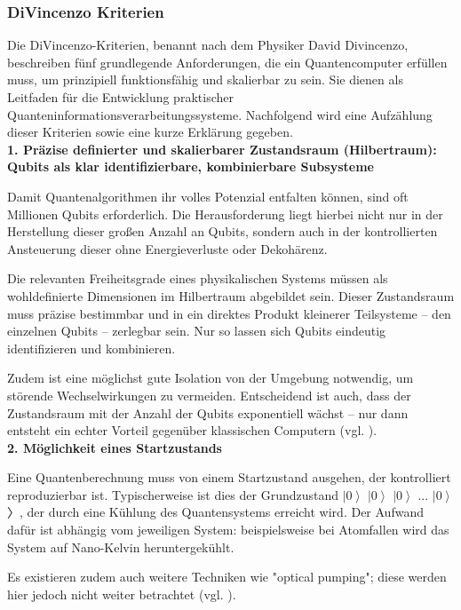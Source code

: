 \subsubsection{DiVincenzo Kriterien}

Die DiVincenzo-Kriterien, benannt nach dem Physiker David Divincenzo, beschreiben fünf grundlegende Anforderungen, die ein Quantencomputer erfüllen muss, um prinzipiell funktionsfähig und skalierbar zu sein. Sie dienen als Leitfaden für die Entwicklung praktischer Quanteninformationsverarbeitungssysteme. Nachfolgend wird eine Aufzählung dieser Kriterien sowie eine kurze Erklärung gegeben. \\

\textbf{1. Präzise definierter und skalierbarer Zustandsraum (Hilbertraum): Qubits als klar identifizierbare, kombinierbare Subsysteme} 

Damit Quantenalgorithmen ihr volles Potenzial entfalten können, sind oft Millionen Qubits erforderlich. Die Herausforderung liegt hierbei nicht nur in der Herstellung dieser großen Anzahl an Qubits, sondern auch in der kontrollierten Ansteuerung dieser ohne Energieverluste oder Dekohärenz.


Die relevanten Freiheitsgrade eines physikalischen Systems müssen als wohldefinierte Dimensionen im Hilbertraum abgebildet sein. Dieser Zustandsraum muss präzise bestimmbar und in ein direktes Produkt kleinerer Teilsysteme – den einzelnen Qubits – zerlegbar sein. Nur so lassen sich Qubits eindeutig identifizieren und kombinieren.


Zudem ist eine möglichst gute Isolation von der Umgebung notwendig, um störende Wechselwirkungen zu vermeiden. Entscheidend ist auch, dass der Zustandsraum mit der Anzahl der Qubits exponentiell wächst – nur dann entsteht ein echter Vorteil gegenüber klassischen Computern (vgl. \cite[Ch. 18]{lapierre_introduction_2021}).
 \\

\textbf{{2. Möglichkeit eines Startzustands} }

Eine Quantenberechnung muss von einem Startzustand ausgehen, der kontrolliert reproduzierbar ist. Typischerweise ist dies der Grundzustand \(\left| 0\right\rangle\) \(\left| 0\right\rangle\) \(\left| 0\right\rangle\) ... \(\left| 0\right\rangle\)〉, der durch eine Kühlung des Quantensystems erreicht wird.  Der Aufwand dafür ist abhängig vom jeweiligen System: beispielsweise bei Atomfallen wird das System auf Nano-Kelvin heruntergekühlt. 

Es existieren zudem auch weitere Techniken wie "optical pumping"; diese werden hier jedoch nicht weiter betrachtet (vgl. \cite[Ch. 18]{lapierre_introduction_2021}). \\


